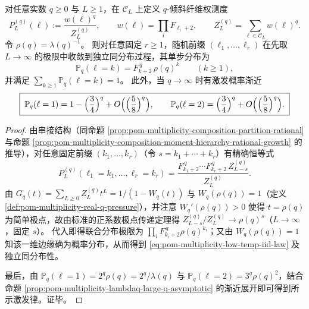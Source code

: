 \begin{proposition}\label{prop:pom-multiplicity-low-temperature-gibbs}
对任意实数 \(q\ge 0\) 与 \(L\ge 1\)，在 \(\mathcal{C}_L\) 上定义 \(q\)-倾斜纤维权测度
\[
P^{(q)}_{L}(\boldsymbol{\ell})
:=\frac{w(\boldsymbol{\ell})^{q}}{Z_L^{(q)}},
\qquad
w(\boldsymbol{\ell})=\prod_{i}F_{\ell_i+2},
\qquad
Z_L^{(q)}=\sum_{\boldsymbol{\ell}\in\mathcal{C}_L}w(\boldsymbol{\ell})^{q}.
\]
令 \(\rho(q)=\lambda(q)^{-1}\)。
则对任意固定 \(r\ge 1\)，随机前缀 \((\ell_1,\dots,\ell_r)\) 在先取 \(L\to\infty\) 的极限中收敛到独立同分布过程，其单步分布为
\begin{equation}\label{eq:pom-multiplicity-low-temp-iid-law}
\boxed{\;
\mathbb{P}_q(\ell=k)=F_{k+2}^{\,q}\,\rho(q)^{k}\qquad(k\ge 1),\;}
\end{equation}
并满足 \(\sum_{k\ge 1}\mathbb{P}_q(\ell=k)=1\)。
此外，当 \(q\to\infty\) 时有激发概率渐近
\[
\boxed{\;
\mathbb{P}_q(\ell=1)=1-\Bigl(\frac34\Bigr)^{q}+O\Bigl(\Bigl(\frac58\Bigr)^{q}\Bigr),\qquad
\mathbb{P}_q(\ell=2)=\Bigl(\frac34\Bigr)^{q}+O\Bigl(\Bigl(\frac58\Bigr)^{q}\Bigr).\;}
\]
\end{proposition}
\begin{proof}
由串接结构（同命题 \ref{prop:pom-multiplicity-composition-partition-rational} 与命题 \ref{prop:pom-multiplicity-composition-moment-hierarchy-rational-growth} 的推导），对任意固定前缀 \((k_1,\dots,k_r)\)（令 \(s=k_1+\cdots+k_r\)）有精确恒等式
\[
P^{(q)}_{L}(\ell_1=k_1,\dots,\ell_r=k_r)
=\frac{F_{k_1+2}^{\,q}\cdots F_{k_r+2}^{\,q}\,Z_{L-s}^{(q)}}{Z_{L}^{(q)}}.
\]
由 \(G_q(t)=\sum_{L\ge 0}Z_L^{(q)}t^L=1/(1-W_q(t))\) 与 \(W_q(\rho(q))=1\)（定义 \ref{def:pom-multiplicity-real-q-pressure}），并注意
\(
W_q'(\rho(q))>0
\)
使得 \(t=\rho(q)\) 为简单极点，故由标准的正系数极点传递定理得
\(
Z_{L-s}^{(q)}/Z_L^{(q)}\to \rho(q)^{s}
\)（\(L\to\infty\)，固定 \(s\)）。
代入即得联合分布极限为 \(\prod_i F_{k_i+2}^{\,q}\rho(q)^{k_i}\)；又由 \(W_q(\rho(q))=1\) 知该一维边缘确为概率分布，从而得到 \eqref{eq:pom-multiplicity-low-temp-iid-law} 及独立同分布性。
\par
最后，由 \(\mathbb{P}_q(\ell=1)=2^q\rho(q)=2^q/\lambda(q)\) 与 \(\mathbb{P}_q(\ell=2)=3^q\rho(q)^2\)，结合命题 \ref{prop:pom-multiplicity-lambdaq-large-q-asymptotic} 的渐近展开即可得到所示激发律。证毕。
\end{proof}

